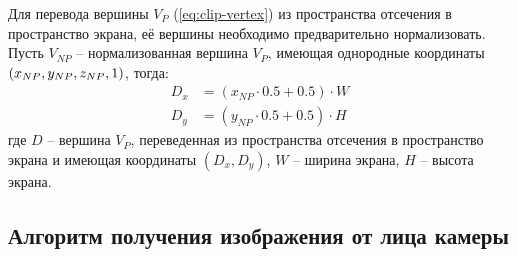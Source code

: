 Для перевода вершины $V_P$ (\ref{eq:clip-vertex}) из пространства отсечения в пространство экрана, её вершины необходимо предварительно нормализовать. Пусть $V_{NP}$ -- нормализованная вершина $V_P$, имеющая однородные координаты $(x_{NP}, y_{NP}, \\ z_{NP}, 1)$, тогда:
\begin{equation}
	\begin{aligned}
		D_x &= (x_{NP} \cdot 0.5 + 0.5) \cdot W \\
		D_y &= (y_{NP} \cdot 0.5 + 0.5) \cdot H
	\end{aligned}
\end{equation}
где $D$ -- вершина $V_P$, переведенная из пространства отсечения в пространство экрана и имеющая координаты $(D_x, D_y)$, $W$ -- ширина экрана, $H$ -- высота экрана.

\subsection{Алгоритм получения изображения от лица камеры}


